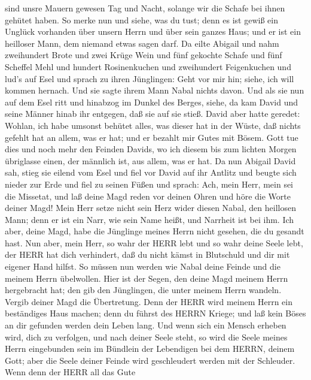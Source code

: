 sind unsre Mauern gewesen Tag und Nacht, solange wir die Schafe bei
ihnen gehütet haben.  So merke nun und siehe, was du tust;
denn es ist gewiß ein Unglück vorhanden über unsern Herrn und über sein
ganzes Haus; und er ist ein heilloser Mann, dem niemand etwas sagen
darf.  Da eilte Abigail und nahm zweihundert Brote und zwei
Krüge Wein und fünf gekochte Schafe und fünf Scheffel Mehl und hundert
Rosinenkuchen und zweihundert Feigenkuchen und lud's auf Esel
 und sprach zu ihren Jünglingen: Geht vor mir hin; siehe,
ich will kommen hernach. Und sie sagte ihrem Mann Nabal nichts davon.
 Und als sie nun auf dem Esel ritt und hinabzog im Dunkel
des Berges, siehe, da kam David und seine Männer hinab ihr entgegen, daß
sie auf sie stieß.  David aber hatte geredet: Wohlan, ich
habe umsonst behütet alles, was dieser hat in der Wüste, daß nichts
gefehlt hat an allem, was er hat; und er bezahlt mir Gutes mit Bösem.
 Gott tue dies und noch mehr den Feinden Davids, wo ich
diesem bis zum lichten Morgen übriglasse einen, der männlich ist, aus
allem, was er hat.  Da nun Abigail David sah, stieg sie
eilend vom Esel und fiel vor David auf ihr Antlitz und beugte sich
nieder zur Erde  und fiel zu seinen Füßen und sprach: Ach,
mein Herr, mein sei die Missetat, und laß deine Magd reden vor deinen
Ohren und höre die Worte deiner Magd!  Mein Herr setze
nicht sein Herz wider diesen Nabal, den heillosen Mann; denn er ist ein
Narr, wie sein Name heißt, und Narrheit ist bei ihm. Ich aber, deine
Magd, habe die Jünglinge meines Herrn nicht gesehen, die du gesandt
hast.  Nun aber, mein Herr, so wahr der HERR lebt und so
wahr deine Seele lebt, der HERR hat dich verhindert, daß du nicht kämst
in Blutschuld und dir mit eigener Hand hilfst. So müssen nun werden wie
Nabal deine Feinde und die meinem Herrn übelwollen.  Hier
ist der Segen, den deine Magd meinem Herrn hergebracht hat; den gib den
Jünglingen, die unter meinem Herrn wandeln.  Vergib deiner
Magd die Übertretung. Denn der HERR wird meinem Herrn ein beständiges
Haus machen; denn du führst des HERRN Kriege; und laß kein Böses an dir
gefunden werden dein Leben lang.  Und wenn sich ein Mensch
erheben wird, dich zu verfolgen, und nach deiner Seele steht, so wird
die Seele meines Herrn eingebunden sein im Bündlein der Lebendigen bei
dem HERRN, deinem Gott; aber die Seele deiner Feinde wird geschleudert
werden mit der Schleuder.  Wenn denn der HERR all das Gute
